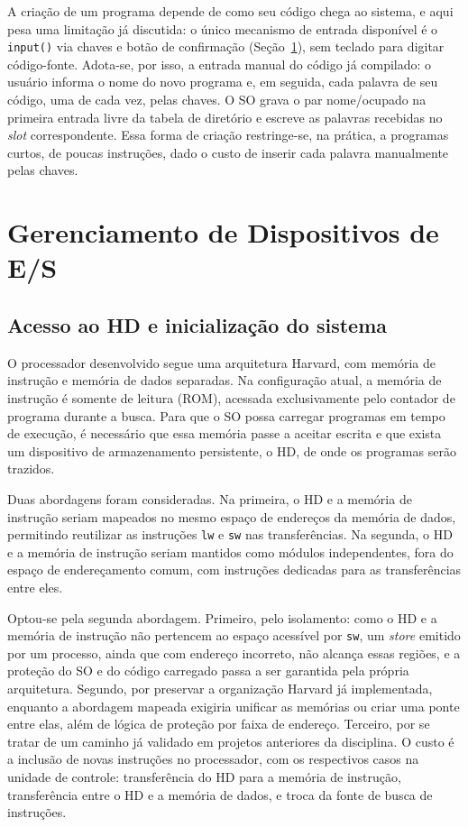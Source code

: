 \documentclass[
	12pt,				%
	openright,			%
	a4paper,			%
	english,			%
	french,				%
	spanish,			%
	brazilian,				%
	]{abntex2}
\begin{document}
A criação de um programa depende de como seu código chega ao sistema, e aqui
pesa uma limitação já discutida: o único mecanismo de entrada disponível é o
\texttt{input()} via chaves e botão de confirmação (Seção~\ref{sec:es}), sem
teclado para digitar código-fonte. Adota-se, por isso, a entrada manual do
código já compilado: o usuário informa o nome do novo programa e, em seguida,
cada palavra de seu código, uma de cada vez, pelas chaves. O SO grava o par
nome/ocupado na primeira entrada livre da tabela de diretório e escreve as
palavras recebidas no \emph{slot} correspondente. Essa forma de criação
restringe-se, na prática, a programas curtos, de poucas instruções, dado o
custo de inserir cada palavra manualmente pelas chaves.

\section{Gerenciamento de Dispositivos de E/S}
\label{sec:es}

\subsection{Acesso ao HD e inicialização do sistema}

O processador desenvolvido segue uma arquitetura Harvard, com memória de instrução e
memória de dados separadas. Na configuração atual, a memória de instrução é somente de
leitura (ROM), acessada exclusivamente pelo contador de programa durante a busca. Para
que o SO possa carregar programas em tempo de execução, é necessário que essa memória
passe a aceitar escrita e que exista um dispositivo de armazenamento persistente, o HD,
de onde os programas serão trazidos.

Duas abordagens foram consideradas. Na primeira, o HD e a memória de instrução seriam
mapeados no mesmo espaço de endereços da memória de dados, permitindo reutilizar as
instruções \texttt{lw} e \texttt{sw} nas transferências. Na segunda, o HD e a memória de
instrução seriam mantidos como módulos independentes, fora do espaço de endereçamento
comum, com instruções dedicadas para as transferências entre eles.

Optou-se pela segunda abordagem. Primeiro, pelo isolamento: como o HD e a memória de
instrução não pertencem ao espaço acessível por \texttt{sw}, um \emph{store} emitido por
um processo, ainda que com endereço incorreto, não alcança essas regiões, e a proteção
do SO e do código carregado passa a ser garantida pela própria arquitetura. Segundo, por
preservar a organização Harvard já implementada, enquanto a abordagem mapeada exigiria
unificar as memórias ou criar uma ponte entre elas, além de lógica de proteção por faixa
de endereço. Terceiro, por se tratar de um caminho já validado em projetos anteriores da
disciplina. O custo é a inclusão de novas instruções no processador, com os respectivos
casos na unidade de controle: transferência do HD para a memória de instrução,
transferência entre o HD e a memória de dados, e troca da fonte de busca de instruções.
\end{document}
